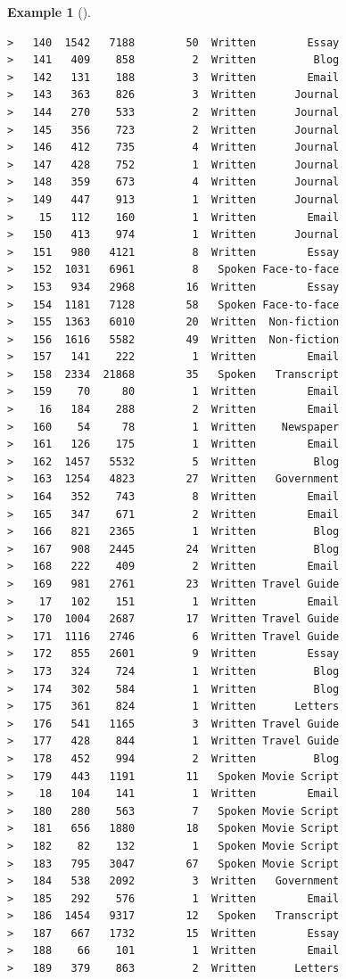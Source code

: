 \documentclass[
  letterpaper,
  DIV=11,
  numbers=noendperiod]{scrreport}
\theoremstyle{definition}
\newtheorem{example}{Example}[chapter]
\theoremstyle{remark}
\begin{document}
\begin{example}[]
\begin{verbatim}
>   140  1542   7188        50  Written        Essay
>   141   409    858         2  Written         Blog
>   142   131    188         3  Written        Email
>   143   363    826         3  Written      Journal
>   144   270    533         2  Written      Journal
>   145   356    723         2  Written      Journal
>   146   412    735         4  Written      Journal
>   147   428    752         1  Written      Journal
>   148   359    673         4  Written      Journal
>   149   447    913         1  Written      Journal
>    15   112    160         1  Written        Email
>   150   413    974         1  Written      Journal
>   151   980   4121         8  Written        Essay
>   152  1031   6961         8   Spoken Face-to-face
>   153   934   2968        16  Written        Essay
>   154  1181   7128        58   Spoken Face-to-face
>   155  1363   6010        20  Written  Non-fiction
>   156  1616   5582        49  Written  Non-fiction
>   157   141    222         1  Written        Email
>   158  2334  21868        35   Spoken   Transcript
>   159    70     80         1  Written        Email
>    16   184    288         2  Written        Email
>   160    54     78         1  Written    Newspaper
>   161   126    175         1  Written        Email
>   162  1457   5532         5  Written         Blog
>   163  1254   4823        27  Written   Government
>   164   352    743         8  Written        Email
>   165   347    671         2  Written        Email
>   166   821   2365         1  Written         Blog
>   167   908   2445        24  Written         Blog
>   168   222    409         2  Written        Email
>   169   981   2761        23  Written Travel Guide
>    17   102    151         1  Written        Email
>   170  1004   2687        17  Written Travel Guide
>   171  1116   2746         6  Written Travel Guide
>   172   855   2601         9  Written        Essay
>   173   324    724         1  Written         Blog
>   174   302    584         1  Written         Blog
>   175   361    824         1  Written      Letters
>   176   541   1165         3  Written Travel Guide
>   177   428    844         1  Written Travel Guide
>   178   452    994         2  Written         Blog
>   179   443   1191        11   Spoken Movie Script
>    18   104    141         1  Written        Email
>   180   280    563         7   Spoken Movie Script
>   181   656   1880        18   Spoken Movie Script
>   182    82    132         1   Spoken Movie Script
>   183   795   3047        67   Spoken Movie Script
>   184   538   2092         3  Written   Government
>   185   292    576         1  Written        Email
>   186  1454   9317        12   Spoken   Transcript
>   187   667   1732        15  Written        Essay
>   188    66    101         1  Written        Email
>   189   379    863         2  Written      Letters
\end{verbatim}


\end{example}
\end{document}
